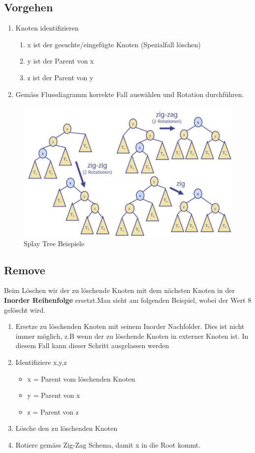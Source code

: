 \subsection{Vorgehen}
\begin{enumerate}
	\item Knoten identifizieren
	\begin{enumerate}
		\item x ist der gesuchte/eingefügte Knoten (Spezialfall löschen)
		\item y ist der Parent von x
		\item z ist der Parent von y
	\end{enumerate}
	\item Gemäss Flussdiagramm korrekte Fall auswählen und Rotation durchführen.
\end{enumerate}

\begin{figure}[h]
	\centering
	\includegraphics[width=0.7\linewidth]{images/splay_trees_zig-zag}
	\caption{Splay Tree Beispiele}
	\label{fig:splaytreeszig-zag}
\end{figure}

\subsection{Remove}
Beim Löschen wir der zu löschende Knoten mit dem nächsten Knoten in der \textbf{Inorder Reihenfolge} ersetzt.Man sieht am folgenden Beispiel, wobei der Wert 8 gelöscht wird.
\begin{enumerate}
	\item Ersetze zu löschenden Knoten mit seinem Inorder Nachfolder. Dies ist nicht immer möglich, z.B wenn der zu löschende Knoten in externer Knoten ist. In diesem Fall kann dieser Schritt ausgelassen werden
	\item Identifiziere x,y,z
	\begin{itemize}
		\item x = Parent vom löschenden Knoten
		\item y = Parent von x
		\item z = Parent von z
	\end{itemize}
	\item Lösche den zu löschenden Knoten
	\item Rotiere gemäss Zig-Zag Schema, damit x in die Root kommt.
\end{enumerate}

